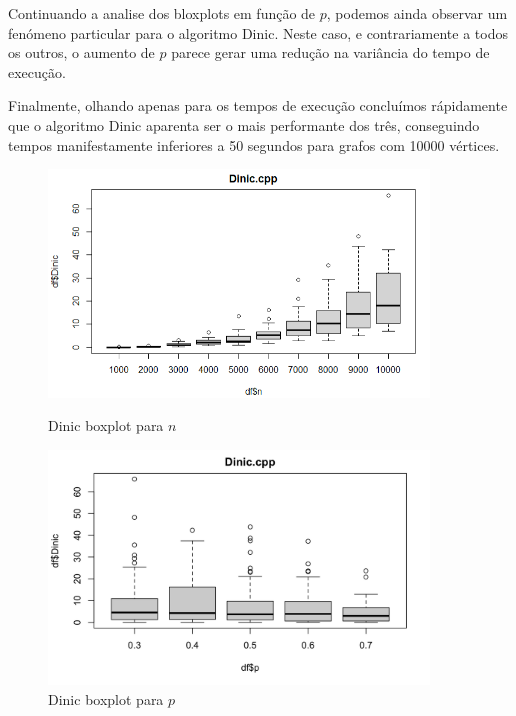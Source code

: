 \documentclass{uofa-eng-assignment}
\begin{document}
Continuando a analise dos bloxplots em função de $p$, podemos ainda observar um fenómeno particular para o algoritmo Dinic. Neste caso, e contrariamente a todos os outros, o aumento de $p$ parece gerar uma redução na variância do tempo de execução.

Finalmente, olhando apenas para os tempos de execução concluímos rápidamente que o algoritmo Dinic aparenta ser o mais performante dos três, conseguindo tempos manifestamente inferiores a 50 segundos para grafos com 10000 vértices.

\begin{figure}[h]
    \begin{minipage}{0.45\textwidth}
        \centering
        \includegraphics[width=0.9\textwidth]{dinic box.png}
        \caption{Dinic boxplot para $n$}
        \label{fig:boxplot-dinic-n}
    \end{minipage}
    \hfill
    \begin{minipage}{0.45\textwidth}
        \centering
        \includegraphics[width=0.9\textwidth]{dinic-p.png}
        \caption{Dinic boxplot para $p$}
        \label{fig:boxplot-dinic-p}
    \end{minipage}
\end{figure}
\end{document}
